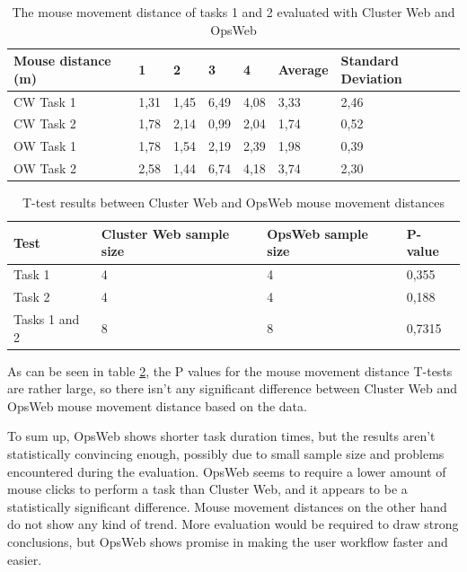 \begin{table}[!ht]
\def\arraystretch{1.1}%
    \begin{center}
    \caption{The mouse movement distance of tasks 1 and 2 evaluated with Cluster Web and OpsWeb}
    \label{cw_ow_distances}
    \begin{tabular}{| l | l | l | l | l | l | l | }
    \hline
    Mouse distance (m) & 1  & 2  & 3  & 4  & Average & Standard Deviation \\
    \hline
    CW Task 1          & 1,31 & 1,45 & 6,49 & 4,08 & 3,33    & 2,46               \\
    CW Task 2          & 1,78 & 2,14 & 0,99 & 2,04 & 1,74    & 0,52               \\
    OW Task 1          & 1,78 & 1,54 & 2,19 & 2,39 & 1,98    & 0,39               \\
    OW Task 2          & 2,58 & 1,44 & 6,74 & 4,18 & 3,74    & 2,30              \\
    \hline
    \end{tabular}
    \end{center}
\end{table}

\begin{table}[!ht]
\def\arraystretch{1.1}%
    \begin{center}
    \caption{T-test results between Cluster Web and OpsWeb mouse movement distances}
    \label{cw_ow_distances_t_test}
    \begin{tabular}{| l | l | l | l | }
    \hline
    Test & Cluster Web sample size & OpsWeb sample size  & P-value   \\
    \hline
    Task 1 & 4 & 4 & 0,355 \\
    Task 2 & 4 & 4 & 0,188 \\
    Tasks 1 and 2 & 8 & 8 & 0,7315 \\
    \hline
    \end{tabular}
    \end{center}
\end{table}

As can be seen in table \ref{cw_ow_distances_t_test}, the P values for the mouse movement distance T-tests are rather large, so there isn't any significant difference between Cluster Web and OpsWeb mouse movement distance based on the data.

To sum up, OpsWeb shows shorter task duration times, but the results aren't statistically convincing enough, possibly due to small sample size and problems encountered during the evaluation. OpsWeb seems to require a lower amount of mouse clicks to perform a task than Cluster Web, and it appears to be a statistically significant difference. Mouse movement distances on the other hand do not show any kind of trend. More evaluation would be required to draw strong conclusions, but OpsWeb shows promise in making the user workflow faster and easier.

